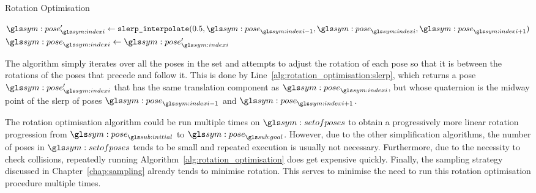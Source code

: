 		\begin{algorithm}[ht]
			\caption{Rotation Optimisation}
			\label{alg:rotation_optimisation}
			\begin{algorithmic}[1]
					\ForAll{$%
						\pose_{\indexi} \in
							\setofposes\setminus
								(\pose_{\initial}, \pose_{\goal})
					$}
						\State{}%
							$
								\pose_{\indexi}' \gets
									\code{slerp\_interpolate}
									(
										0.5,
										\pose_{\indexi - 1},
										\pose_{\indexi},
										\pose_{\indexi + 1}
									)
							$
							\label{alg:rotation_optimisation:slerp}
								\State{}%
									$
										\pose_{\indexi} \gets \pose_{\indexi}'
									$
							\EndIf{}
						\EndIf{}
					\EndFor{}
				\EndProcedure{}
			\end{algorithmic}
		\end{algorithm}

		The algorithm simply iterates over all the poses in the set and attempts
		to adjust the rotation of each pose so that it is between the rotations
		of the poses that precede and follow it. This is done by
		Line~\ref{alg:rotation_optimisation:slerp}, which returns a pose
		$\pose_{\indexi}'$ that has the same translation component as
		$\pose_{\indexi}$, but whose quaternion is the midway point of the
		\gls{slerp} of poses $\pose_{\indexi - 1}$ and $\pose_{\indexi + 1}$.

		The rotation optimisation algorithm could be run multiple times on
		$\setofposes$ to obtain a progressively more linear rotation progression
		from $\pose_{\initial}$ to $\pose_{\goal}$. However, due to the other
		simplification algorithms, the number of poses in $\setofposes$ tends to
		be small and repeated execution is usually not necessary. Furthermore,
		due to the necessity to check collisions, repeatedly running
		Algorithm~\ref{alg:rotation_optimisation} does get expensive quickly.
		Finally, the sampling strategy discussed in Chapter~\ref{chap:sampling}
		already tends to minimise rotation. This serves to minimise the need to
		run this rotation optimisation procedure multiple times.

